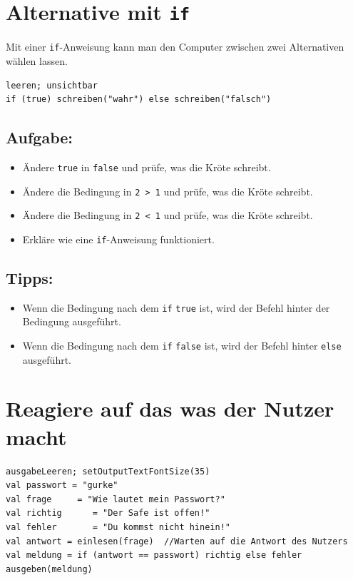 \chapter{Alternative mit \lstinline{if}}Mit einer \lstinline{if}-Anweisung kann man den Computer zwischen zwei Alternativen wählen lassen.

\begin{lstlisting}[basicstyle={\ttfamily\fontsize{20}{24}\selectfont},numbers=none]
leeren; unsichtbar
if (true) schreiben("wahr") else schreiben("falsch")
\end{lstlisting}
        
\section*{\color{BrickRed}Aufgabe:}


\begin{itemize}

\item {Ändere \lstinline{true} in \lstinline{false} und prüfe, was die Kröte schreibt.}
\item {Ändere die Bedingung in \lstinline{2 > 1} und prüfe, was die Kröte schreibt.}
\item {Ändere die Bedingung in \lstinline{2 < 1} und prüfe, was die Kröte schreibt.}
\item {Erkläre wie eine \lstinline{if}-Anweisung funktioniert.}

\end{itemize}


\section*{\color{OliveGreen}Tipps:}


\begin{itemize}

\item {Wenn die Bedingung nach dem \lstinline{if} \lstinline{true} ist, wird der Befehl hinter der Bedingung ausgeführt.}
\item {Wenn die Bedingung nach dem \lstinline{if} \lstinline{false} ist, wird der Befehl hinter \lstinline{else} ausgeführt.}

\end{itemize}


\chapter{Reagiere auf das was der Nutzer macht}
\begin{lstlisting}[basicstyle={\ttfamily\fontsize{20}{24}\selectfont},numbers=none]
ausgabeLeeren; setOutputTextFontSize(35)
val passwort = "gurke"
val frage     = "Wie lautet mein Passwort?"
val richtig      = "Der Safe ist offen!"
val fehler       = "Du kommst nicht hinein!"
val antwort = einlesen(frage)  //Warten auf die Antwort des Nutzers
val meldung = if (antwort == passwort) richtig else fehler
ausgeben(meldung)
\end{lstlisting}
        
